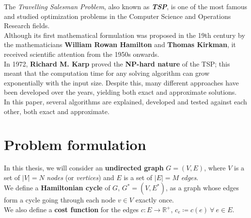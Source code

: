 The \textit{Travelling Salesman Problem}, also known as \textit{\textbf{TSP}}, is one of the most famous and studied optimization problems in the Computer Science and Operations Research fields.\\
Although its first mathematical formulation was proposed in the 19th century by the mathematicians \textbf{William Rowan Hamilton} and \textbf{Thomas Kirkman}, it received scientific attention from the 1950s onwards.\\
In 1972, \textbf{Richard M. Karp} proved the \textbf{NP-hard nature} of the TSP; this meant that the computation time for any solving algorithm can grow exponentially with the input size. Despite this, many different approaches have been developed over the years, yielding both exact and approximate solutions.\\

In this paper, several algorithms are explained, developed and tested against each other, both exact and approximate.

\section{Problem formulation}

In this thesis, we will consider an \textbf{undirected graph} $G=(V, E)$, where $V$ is a set of $|V|=N$ \textit{nodes} (or \textit{vertices}) and $E$ is a set of $|E|=M$ \textit{edges}.\\
We define a \textbf{Hamiltonian cycle} of $G$, $G^*=(V, E^*)$, as a graph whose edges form a cycle going through each node $v\in V$ exactly once.\\
We also define a \textbf{cost function} for the edges $c : E \rightarrow \mathbb{R}^+$, $c_e\coloneq c(e) \ \forall \ e\in E$.\\

